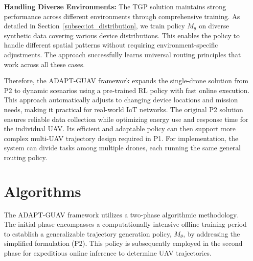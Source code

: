 \documentclass[10pt,conference,letterpaper]{IEEEtran}
\begin{document}
\textbf{Handling Diverse Environments:} The TGP solution maintains strong performance across different environments through comprehensive training. As detailed in Section~\ref{subsec:iot_distribution}, we train policy $M_{\theta}$ on diverse synthetic data covering various device distributions. This enables the policy to handle different spatial patterns without requiring environment-specific adjustments. The approach successfully learns universal routing principles that work across all these cases.


Therefore, the ADAPT-GUAV framework expands the single-drone solution from P2 to dynamic scenarios using a pre-trained RL policy with fast online execution. This approach automatically adjusts to changing device locations and mission needs, making it practical for real-world IoT networks. The original P2 solution ensures reliable data collection while optimizing energy use and response time for the individual UAV. Its efficient and adaptable policy can then support more complex multi-UAV trajectory design required in P1. For implementation, the system can divide tasks among multiple drones, each running the same general routing policy.




\section{Algorithms}
\label{sec:algorithms}

The ADAPT-GUAV framework utilizes a two-phase algorithmic methodology. The initial phase encompasses a computationally intensive offline training period to establish a generalizable trajectory generation policy, $M_{\theta}$, by addressing the simplified formulation (P2). This policy is subsequently employed in the second phase for expeditious online inference to determine UAV trajectories.
\end{document}
